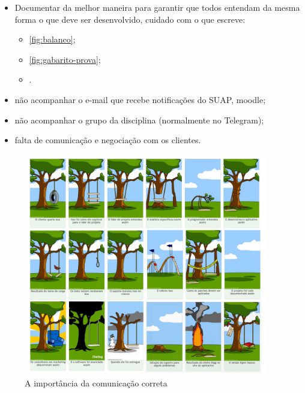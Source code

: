 \begin{itemize}
    \item Documentar da melhor maneira para garantir que todos entendam da mesma forma o que deve ser desenvolvido, cuidado com o que escreve:
    \begin{itemize}
        \item \autoref{fig:balanco};
        
        \item \autoref{fig:gabarito-prova};
        
        \item {}.
    \end{itemize}

    \item não acompanhar o e-mail que recebe notificações do SUAP, moodle;
    
    \item não acompanhar o grupo da disciplina (normalmente no Telegram);
    
    \item falta de comunicação e negociação com os clientes.
\end{itemize}


\begin{figure}
    \centering
	\includegraphics[width=0.95\textwidth]{erros/projeto_balanca_na_arvore.jpg}
    \caption{A importância da comunicação correta}
    \label{fig:balanco}
\end{figure}


